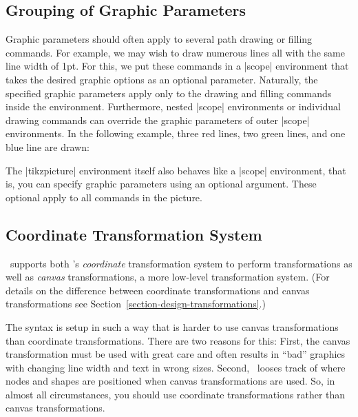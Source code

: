 \subsection{Grouping of Graphic Parameters}

Graphic parameters should often apply to several path drawing or
filling commands. For example, we may wish to draw numerous lines all
with the same line width of 1pt. For this, we put these commands
in a |{scope}| environment that takes the desired graphic options
as an optional parameter. Naturally, the specified graphic
parameters apply only to the drawing and filling commands inside the
environment. Furthermore, nested |{scope}| environments or
individual drawing commands can override the graphic parameters of
outer |{scope}| environments. In the following example, three red
lines, two green lines, and one blue line are drawn:

\begin{codeexample}[]
\begin{tikzpicture}
  \begin{scope}[color=red]
    \draw (0mm,10mm) -- (10mm,10mm);
    \draw (0mm, 8mm) -- (10mm, 8mm);
    \draw (0mm, 6mm) -- (10mm, 6mm);
  \end{scope}
  \begin{scope}[color=green]
    \draw             (0mm, 4mm) -- (10mm, 4mm);
    \draw             (0mm, 2mm) -- (10mm, 2mm);
    \draw[color=blue] (0mm, 0mm) -- (10mm, 0mm);
  \end{scope}
\end{tikzpicture}
\end{codeexample}

The |{tikzpicture}| environment itself also behaves like a
|{scope}| environment, that is, you can specify graphic parameters
using an optional argument. These optional apply to all commands in
the picture.


\subsection{Coordinate Transformation System}

\tikzname\ supports both \pgfname's \emph{coordinate} transformation
system to perform transformations as well as \emph{canvas}
transformations, a more low-level transformation system. (For 
details on the difference between coordinate transformations and
canvas transformations see Section~\ref{section-design-transformations}.) 

The syntax is setup in such a way that is harder to use canvas
transformations than coordinate transformations. There are two reasons
for this: First, the canvas transformation must be used with great
care and often results in ``bad'' graphics with changing line width
and text in wrong sizes. Second, \pgfname\ looses track of where nodes
and shapes are positioned when canvas transformations are used.
So, in almost all circumstances, you should use coordinate
transformations rather than canvas transformations.
